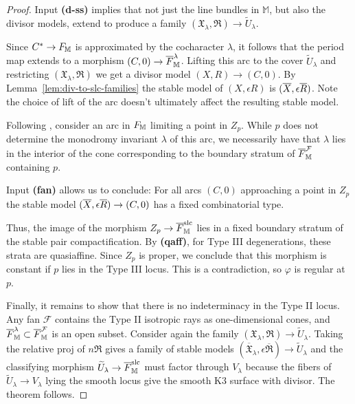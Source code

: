 \documentclass[table,x11names]{amsart}
\begin{document}
\begin{proof}
Input {\bf (d-ss)} implies that not just the line bundles in $\mathbb{M}$,
but also the divisor models, extend to produce a family
$(\mathfrak{X}_\lambda,\mathfrak{R}) \to  \widetilde{U}_\lambda$.

Since $C^*\to F_{\mathbb M}$ is approximated by the cocharacter
$\lambda$, it follows that the period map extends to a morphism
$(C,0)\to {\overline F}_{\mathbb M}^{\lambda}$. Lifting this arc to the
cover $\widetilde{U}_\lambda$ and restricting
$(\mathfrak{X}_\lambda,\mathfrak{R})$ we get a divisor model
 $(X,R)\to (C,0)$. By
Lemma~\ref{lem:div-to-slc-families}
the stable model of $(X,\epsilon R)$ is $({\overline X},\epsilon{\overline R})$.
Note the choice of lift of the arc doesn't ultimately affect
the resulting stable model.

Following \cite[Thm.~10.5]{alexeev2019stable-pair},
consider an arc in $F_{\mathbb M}$ limiting a point in $Z_p$. While $p$
does not determine the monodromy invariant $\lambda$ of this arc,
we necessarily have that $\lambda$ lies in the interior of the cone corresponding to the 
boundary stratum of ${\overline F}_{\mathbb M}^\mathcal{F}$ containing $p$.

 Input {\bf (fan)} allows us to
conclude: For all arcs $(C,0)$ approaching
a point in $Z_p$ the stable model $({\overline X},\epsilon {\overline R})\to (C,0)$ has a fixed combinatorial type.

Thus, the image of the morphism $Z_p\to {\overline F}_{\mathbb M}^{{\rm slc}}$ lies in a fixed
boundary stratum of the stable pair compactification. By {\bf (qaff)}, for
Type III degenerations, these strata are quasiaffine. Since $Z_p$ is proper, we conclude that this
morphism is constant if $p$ lies in the Type III locus.
This is a contradiction, so $\varphi$ is regular at $p$.

Finally, it remains to show that there is no indeterminacy in the Type II locus. Any
fan $\mathcal{F}$ contains the Type II isotropic rays as one-dimensional cones,
and ${\overline F}_{\mathbb M}^\lambda\subset {\overline F}_{\mathbb M}^{\mathcal F}$ is an open subset.
Consider again the family $(\mathfrak{X}_\lambda,\mathfrak{R}) \to  \widetilde{U}_\lambda$.
Taking the relative proj of $n\mathfrak{R}$ gives a family of stable models
$(\overline{\mathfrak{X}}_\lambda,\epsilon\overline{\mathfrak{R}}) \to  \widetilde{U}_\lambda$ and the classifying
morphism $\widetilde{U}_\lambda\to {\overline F}_{\mathbb M}^{\rm slc}$ must factor through $V_\lambda$ because the fibers of
$ \widetilde{U}_\lambda\to V_\lambda$ lying the smooth locus give the smooth K3 surface with divisor.
The theorem follows. \end{proof} 
\end{document}
